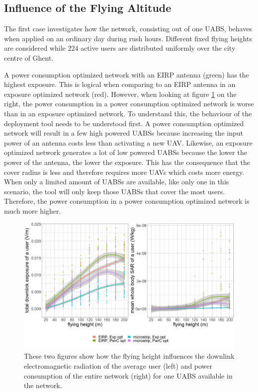 \subsection{Influence of the Flying Altitude}
The first case investigates how the network, consisting out of one \gls{UABS}, behaves when applied on an ordinary day during rush hours. 
Different fixed flying heights are considered while 224 active users are distributed uniformly over the city centre of Ghent. 

A power consumption optimized network with an \gls{EIRP} antenna (green) has the highest exposure. 
This is logical when comparing to an EIRP antenna in an exposure optimized network (red). 
However, when looking at figure \ref{fig:s2a_dlAndPc} on the right, the power consumption in a power consumption optimized network is worse 
than in an exposure optimized network. To understand this, the behaviour of the deployment tool needs to be understood first. 
A power consumption optimized network will result in a few high powered \gls{UABS}s because increasing the input power of an antenna costs 
less than activating a new  \gls{UAV}. Likewise, an exposure optimized network 
generates a lot of low powered \gls{UABS}s because the lower the power of the antenna, the lower the exposure. This has the consequence that the cover radius 
is less and therefore requires more \gls{UAV}s which costs more energy.
When only a limited amount of \gls{UABS}s are available, 
like only one in this scenario, the tool will only keep those \gls{UABS}s that cover the most users. 
Therefore, the power consumption in a power consumption optimized network is much more higher. 


\begin{figure}[h!]
  \includegraphics[width=\textwidth]{../results/s2/fhvsdlAndPc.png}
  \caption{These two figures show how the flying height influences the downlink electromagnetic radiation of the average user (left) and 
  power consumption of the entire network (right) for one \gls{UABS} available in the network.}
  \label{fig:s2a_dlAndPc}
\end{figure}


